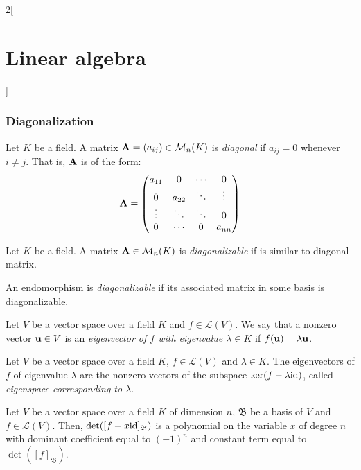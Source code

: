 \documentclass[../../../main.tex]{subfiles}
\begin{document}
\begin{multicols}{2}[\section{Linear algebra}]
  \subsubsection*{Diagonalization}
  \begin{definition}
    Let $K$ be a field. A matrix $\vb{A}=(a_{ij})\in\mathcal{M}_n(K)$ is \textit{diagonal} if $a_{ij}=0$ whenever $i\ne j$. That is, $\vb{A}$ is of the form:
    $$\vb{A}=
      \begin{pmatrix}
        a_{11} & 0      & \cdots & 0      \\
        0      & a_{22} & \ddots & \vdots \\
        \vdots & \ddots & \ddots & 0      \\
        0      & \cdots & 0      & a_{nn}
      \end{pmatrix}
    $$
  \end{definition}
  \begin{definition}
    Let $K$ be a field. A matrix $\vb{A}\in\mathcal{M}_n(K)$ is \textit{diagonalizable} if is similar to diagonal matrix.
  \end{definition}
  \begin{definition}
    An endomorphism is \textit{diagonalizable} if its associated matrix in some basis is diagonalizable.
  \end{definition}
  \begin{definition}
    Let $V$ be a vector space over a field $K$ and $f\in\mathcal{L}(V)$. We say that a nonzero vector $\vb{u}\in V$ is an \textit{eigenvector of $f$ with eigenvalue $\lambda\in K$} if $f(\vb{u})=\lambda \vb{u}$.
  \end{definition}
  \begin{lemma}
    Let $V$ be a vector space over a field $K$, $f\in\mathcal{L}(V)$ and $\lambda\in K$. The eigenvectors of $f$ of eigenvalue $\lambda$ are the nonzero vectors of the subspace $\ker(f-\lambda\mathrm{id})$, called \textit{eigenspace corresponding to $\lambda$}.
  \end{lemma}
  \begin{lemma}
    Let $V$ be a vector space over a field $K$ of dimension $n$, $\mathfrak{B}$ be a basis of $V$ and $f\in\mathcal{L}(V)$. Then, $\det([f-x\mathrm{id}]_\mathfrak{B})$ is a polynomial on the variable $x$ of degree $n$ with dominant coefficient equal to $(-1)^n$ and constant term equal to $\det([f]_\mathfrak{B})$.
  \end{lemma}
  \begin{corollary}

\end{corollary}
\end{multicols}
\end{document}
